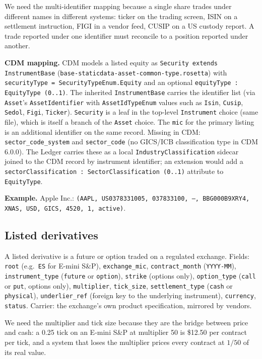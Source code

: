 \documentclass[11pt,a4paper]{article}
\begin{document}
We need the multi-identifier mapping because a single share trades under different names in different systems: ticker on the trading screen, ISIN on a settlement instruction, FIGI in a vendor feed, CUSIP on a US custody report. A trade reported under one identifier must reconcile to a position reported under another.

\textbf{CDM mapping.} CDM models a listed equity as \texttt{Security extends InstrumentBase} (\texttt{base-staticdata-asset-common-type.rosetta}) with \texttt{securityType = SecurityTypeEnum.Equity} and an optional \texttt{equityType : EquityType (0..1)}. The inherited \texttt{InstrumentBase} carries the identifier list (via \texttt{Asset}'s \texttt{AssetIdentifier} with \texttt{AssetIdTypeEnum} values such as \texttt{Isin}, \texttt{Cusip}, \texttt{Sedol}, \texttt{Figi}, \texttt{Ticker}). \texttt{Security} is a leaf in the top-level \texttt{Instrument} choice (same file), which is itself a branch of the \texttt{Asset} choice. The \texttt{mic} for the primary listing is an additional identifier on the same record. Missing in CDM: \texttt{sector\_code\_system} and \texttt{sector\_code} (no GICS/ICB classification type in CDM 6.0.0). The Ledger carries these as a local \texttt{IndustryClassification} sidecar joined to the CDM record by instrument identifier; an extension would add a \texttt{sectorClassification : SectorClassification (0..1)} attribute to \texttt{EquityType}.

\textbf{Example.} Apple Inc.: \texttt{(AAPL, US0378331005, 037833100, ---, BBG000B9XRY4, XNAS, USD, GICS, 4520, 1, active)}.

\subsection{Listed derivatives}

A listed derivative is a future or option traded on a regulated exchange. Fields: \texttt{root} (e.g.\ \texttt{ES} for E-mini S\&P), \texttt{exchange\_mic}, \texttt{contract\_month} (\texttt{YYYY-MM}), \texttt{instrument\_type} (\texttt{future} or \texttt{option}), \texttt{strike} (options only), \texttt{option\_type} (\texttt{call} or \texttt{put}, options only), \texttt{multiplier}, \texttt{tick\_size}, \texttt{settlement\_type} (\texttt{cash} or \texttt{physical}), \texttt{underlier\_ref} (foreign key to the underlying instrument), \texttt{currency}, \texttt{status}. Carrier: the exchange's own product specification, mirrored by vendors.

We need the multiplier and tick size because they are the bridge between price and cash: a 0.25 tick on an E-mini S\&P at multiplier 50 is \$12.50 per contract per tick, and a system that loses the multiplier prices every contract at $1/50$ of its real value.
\end{document}
